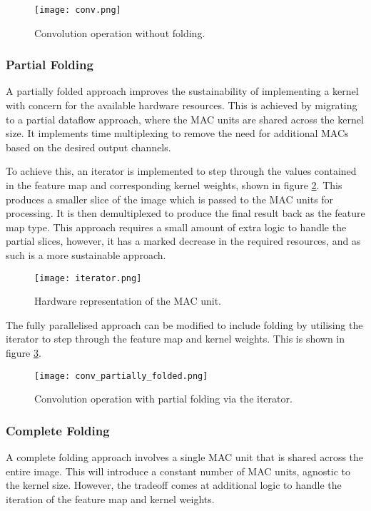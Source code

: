 \begin{figure}[h]
    \centering
    \texttt{[image: conv.png]}
    \caption{Convolution operation without folding.}
    \label{fig:conv}
\end{figure}


\subsubsection{Partial Folding}
A partially folded approach improves the sustainability of implementing a kernel with concern for the available hardware resources.
This is achieved by migrating to a partial dataflow approach, where the MAC units are shared across the kernel size.
It implements time multiplexing to remove the need for additional MACs based on the desired output channels.

To achieve this, an iterator is implemented to step through the values contained in the feature map and corresponding kernel weights, shown in figure \ref{fig:iterator}.
This produces a smaller slice of the image which is passed to the MAC units for processing.
It is then demultiplexed to produce the final result back as the feature map type.
This approach requires a small amount of extra logic to handle the partial slices, however, it has a marked decrease in the required resources, and as such is a more sustainable approach.

\begin{figure}[h]
    \centering
    \texttt{[image: iterator.png]}
    \caption{Hardware representation of the MAC unit.}
    \label{fig:iterator}
\end{figure}

The fully parallelised approach can be modified to include folding by utilising the iterator to step through the feature map and kernel weights.
This is shown in figure \ref{fig:partial_folded}.

\begin{figure}[h]
    \centering
    \texttt{[image: conv\_partially\_folded.png]}
    \caption{Convolution operation with partial folding via the iterator.}
    \label{fig:partial_folded}
\end{figure}



\subsubsection{Complete Folding}
A complete folding approach involves a single MAC unit that is shared across the entire image.
This will introduce a constant number of MAC units, agnostic to the kernel size.
However, the tradeoff comes at additional logic to handle the iteration of the feature map and kernel weights.

